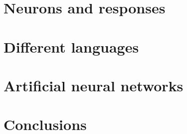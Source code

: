 
\section{Neurons and responses}

\section{Different languages}

\section{Artificial neural networks}

\section{Conclusions}
